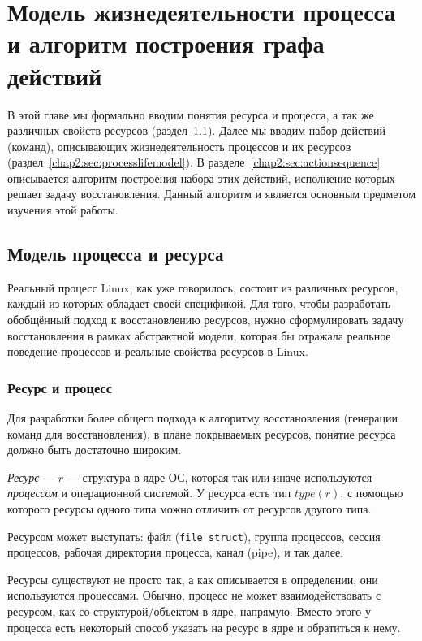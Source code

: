 
\chapter{Модель жизнедеятельности процесса и алгоритм построения графа действий}

В этой главе мы формально вводим понятия ресурса и процесса, а так же различных свойств ресурсов 
(раздел~\ref{chap2:sec:procresmodel}). Далее мы вводим набор действий (команд), описывающих жизнедеятельность 
процессов и их ресурсов (раздел~\ref{chap2:sec:processlifemodel}). В разделе~\ref{chap2:sec:actionsequence} 
описывается алгоритм построения набора этих действий, исполнение которых решает задачу восстановления. 
Данный алгоритм и является основным предметом изучения этой работы.

\section{Модель процесса и ресурса}
\label{chap2:sec:procresmodel}

Реальный процесс Linux, как уже говорилось, состоит из различных ресурсов, каждый из которых обладает своей 
спецификой. Для того, чтобы разработать обобщённый подход к восстановлению ресурсов, нужно сформулировать задачу 
восстановления в рамках абстрактной модели, которая бы отражала реальное поведение процессов и реальные свойства 
ресурсов в Linux.

\subsection{Ресурс и процесс}

Для разработки более общего подхода к алгоритму восстановления (генерации команд для восстановления), в плане 
покрываемых ресурсов, понятие ресурса должно быть достаточно широким.

\begin{defn}
\label{def:resource}
\emph{Ресурс} --- $r$ --- структура в ядре ОС, которая так или иначе используются \emph{процессом} и операционной 
системой. У ресурса есть тип $type(r)$, с помощью которого ресурсы одного типа можно отличить от ресурсов другого типа.
\end{defn}

Ресурсом может выступать: файл (\texttt{file struct}), группа процессов, сессия процессов, рабочая директория 
процесса, канал (pipe), и так далее.

Ресурсы существуют не просто так, а как описывается в определении, они используются процессами. Обычно, процесс не 
может взаимодействовать с ресурсом, как со структурой/объектом в ядре, напрямую. Вместо этого у процесса есть 
некоторый способ указать на ресурс в ядре и обратиться к нему.

